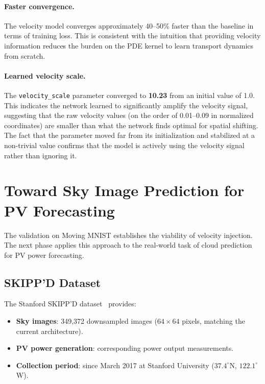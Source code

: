 \documentclass[11pt,a4paper]{article}
\begin{document}
\paragraph{Faster convergence.} The velocity model converges approximately 40--50\% faster than the baseline in terms of training loss. This is consistent with the intuition that providing velocity information reduces the burden on the PDE kernel to learn transport dynamics from scratch.

\paragraph{Learned velocity scale.} The \texttt{velocity\_scale} parameter converged to \textbf{10.23} from an initial value of 1.0. This indicates the network learned to significantly amplify the velocity signal, suggesting that the raw velocity values (on the order of 0.01--0.09 in normalized coordinates) are smaller than what the network finds optimal for spatial shifting. The fact that the parameter moved far from its initialization and stabilized at a non-trivial value confirms that the model is actively using the velocity signal rather than ignoring it.

\section{Toward Sky Image Prediction for PV Forecasting}
\label{sec:future}

The validation on Moving MNIST establishes the viability of velocity injection. The next phase applies this approach to the real-world task of cloud prediction for PV power forecasting.

\subsection{SKIPP'D Dataset}

The Stanford SKIPP'D dataset~\cite{skippd} provides:
\begin{itemize}[nosep]
    \item \textbf{Sky images}: 349,372 downsampled images ($64 \times 64$ pixels, matching the current architecture).
    \item \textbf{PV power generation}: corresponding power output measurements.
    \item \textbf{Collection period}: since March 2017 at Stanford University ($37.4^\circ$N, $122.1^\circ$W).
\end{itemize}
\end{document}
